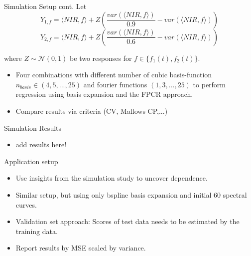 \documentclass{beamer}
\begin{document}
	
	\begin{frame}{Simulation Setup cont.}
		Let 
		$$Y_{1,f} = \langle NIR, f\rangle + Z\left(  \frac{var(\langle NIR, f\rangle)}{0.9} - var(\langle NIR, f\rangle)\right)$$ 
		$$Y_{2,f} = \langle NIR, f\rangle + Z\left( \frac{var(\langle NIR, f\rangle)}{0.6} - var(\langle NIR, f\rangle)\right)$$
		
		where $Z \sim \mathcal{N}(0,1)$ be two responses for $f \in \{f_1(t), f_2(t)\}$.	
		\begin{itemize}
    		\item Four combinations with different number of cubic basis-function $n_{basis} \in (4,5,...,25)$ and fourier functions $(1,3,...,25)$ to perform regression using basis expansion and the FPCR approach.
			\item Compare results via criteria (CV, Mallows CP,...)
		
		\end{itemize}
	\end{frame}
	
	
	\begin{frame}{Simulation Results}
		
		\begin{itemize}
    		
			\item {\color{green} add results here!}
		\end{itemize}
	\end{frame}
		
	\begin{frame}{Application setup}
		\begin{itemize}
		\item
    		Use insights from the simulation study to uncover dependence.
    		\item
    		Similar setup, but using only bspline basis expansion and initial 60 spectral curves.
    		\item
    		Validation set approach:	Scores of test data needs to be estimated by the training data. 
    		\item
    		Report results by MSE scaled by variance.
		\end{itemize}
	\end{frame}
	
\end{document}
